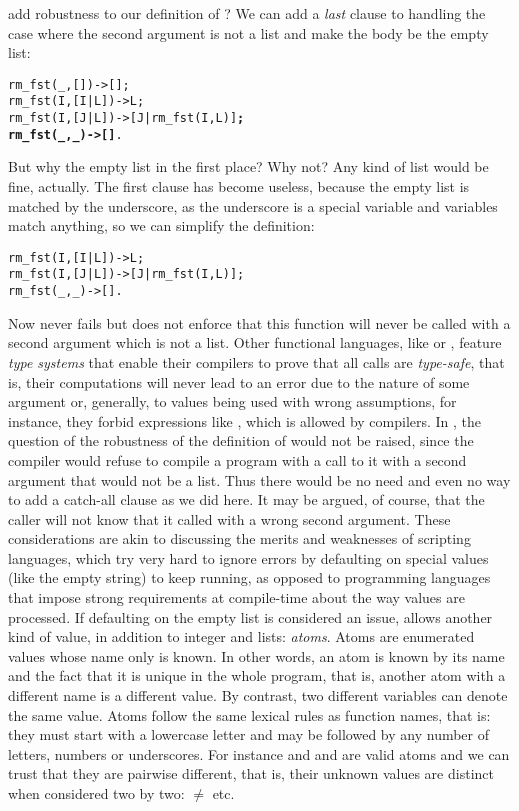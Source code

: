 add robustness to our definition of ? We can add a
\emph{last} clause to handling the case where the second argument is
not a list and make the body be the empty list:
\begin{alltt}
rm_fst(_,   []) -> [];
rm_fst(I,[I|L]) -> L;
rm_fst(I,[J|L]) -> [J|rm_fst(I,L)]\textbf{;}
\textbf{rm_fst(_,    _) -> []}.\hfill% \emph{A catch-all clause}
\end{alltt}
But why the empty list in the first place? Why not? Any kind of list
would be fine, actually. The first clause has become useless, because
the empty list is matched by the underscore, as the underscore is a
special variable and variables match anything, so we can simplify the
definition:
\begin{alltt}
rm_fst(I,[I|L]) -> L;
rm_fst(I,[J|L]) -> [J|rm_fst(I,L)];
rm_fst(_,    _) -> [].
\end{alltt}
Now  never fails but \Erlang does not enforce that
this function will never be called with a second argument which is not
a list. Other functional languages, like \Haskell or \OCaml, feature
\emph{type systems} that enable their compilers to prove that all
calls are \emph{type\hyp{}safe}, that is, their computations will
never lead to an error due to the nature of some argument or,
generally, to values being used with wrong assumptions, for instance, they
forbid expressions like , which is allowed by \Erlang
compilers. In \OCaml, the question of the robustness of the definition
of  would not be raised, since the compiler
would refuse to compile a program with a call to it with a second
argument that would not be a list. Thus there would be no need and
even no way to add a catch\hyp{}all clause as we did here. It may be
argued, of course, that the caller will not know that it called
 with a wrong second argument. These considerations
are akin to discussing the merits and weaknesses of scripting
languages, which try very hard to ignore errors by defaulting on
special values (like the empty string) to keep running, as opposed to
programming languages that impose strong requirements at
compile\hyp{}time about the way values are processed. If defaulting on
the empty list is considered an issue, \Erlang allows another kind of
value, in addition to integer and lists: \emph{atoms}. Atoms are
enumerated values whose name only is known. In other words, an atom is
known by its name and the fact that it is unique in the whole program,
that is, another atom with a different name is a different value. By
contrast, two different variables can denote the same value. Atoms
follow the same lexical rules as function names, that is: they must
start with a lowercase letter and may be followed by any number of
letters, numbers or underscores. For instance  and
 and  are valid atoms and we can trust
that they are pairwise different, that is, their unknown values are
distinct when considered two by two:  \(\neq\)
 etc.

